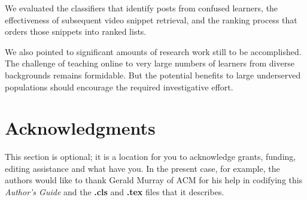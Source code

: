 \documentclass{edm_template}
\begin{document}
We evaluated the classifiers that identify posts from confused
learners, the effectiveness of subsequent video snippet retrieval, and
the ranking process that orders those snippets into ranked lists.

We also pointed to significant amounts of research work still to be
accomplished. The challenge of teaching online to very large numbers
of learners from diverse backgrounds remains formidable. But the
potential benefits to large underserved populations should encourage
the required investigative effort.


\section{Acknowledgments}
This section is optional\cite{wen2014sentiment}; it is a location for you
to acknowledge grants, funding, editing assistance and
what have you.  In the present case, for example, the
authors would like to thank Gerald Murray of ACM for
his help in codifying this \textit{Author's Guide}
and the \textbf{.cls} and \textbf{.tex} files that it describes.

%

%
%
\balancecolumns
\end{document}
